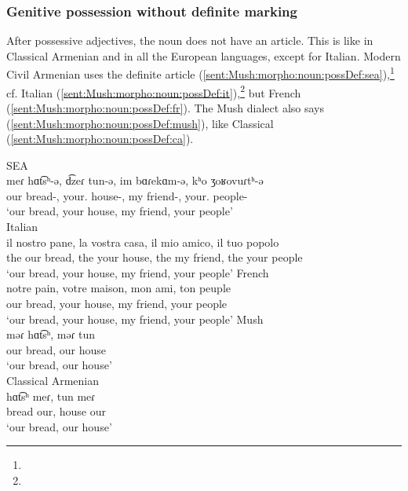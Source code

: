 \subsubsection{Genitive possession without definite marking} 

After possessive adjectives, the noun does not have an article. This is like in Classical Armenian and in all the European languages, except for Italian. Modern Civil Armenian uses the definite article (\ref{sent:Mush:morpho:noun:possDef:sea}),\footnote{} cf. Italian (\ref{sent:Mush:morpho:noun:possDef:it}),\footnote{} but French (\ref{sent:Mush:morpho:noun:possDef:fr}). The Mush dialect also says (\ref{sent:Mush:morpho:noun:possDef:mush}), like Classical (\ref{sent:Mush:morpho:noun:possDef:ca}). 

\begin{exe}
	\ex \begin{xlist}
		\ex SEA \label{sent:Mush:morpho:noun:possDef:sea} \\ \gll
		meɾ hɑt͡sʰ-ə, d͡zeɾ tun-ə, im bɑɾekɑm-ə, kʰo ʒoʁovuɾtʰ-ə \\
		our bread-{}, your.{\pl} house-{}, my friend-{}, your.{\sg} people-{} \\
		\trans `our bread, your house, my friend, your people' \\ 
		\ex Italian\label{sent:Mush:morpho:noun:possDef:it} \\  \gll
		il nostro pane, la vostra casa, il mio amico, il tuo popolo
		\\ the our bread, the your house, the my friend, the your people \\
		\trans `our bread, your house, my friend, your people'
		\ex French\label{sent:Mush:morpho:noun:possDef:fr}\\  \gll 
		notre pain, votre maison, mon ami, ton peuple \\
		our bread, your house, my friend, your people\\
		\trans `our bread, your house, my friend, your people'
		\ex Mush \label{sent:Mush:morpho:noun:possDef:mush} \\ \gll
		məɾ hɑt͡sʰ, məɾ tun \\
		our bread, our house \\
		\trans `our bread, our house' \\
		\ex Classical Armenian \label{sent:Mush:morpho:noun:possDef:ca} \\ \gll
		hɑt͡sʰ meɾ, tun meɾ \\
		bread our, house our\\
			\trans `our bread, our house' \\
	\end{xlist}
\end{exe}

